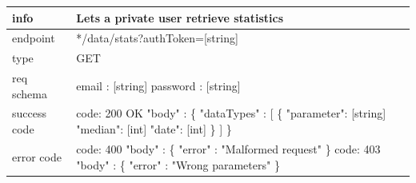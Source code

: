 \documentclass[titlepage]{article}
\begin{document}
\vspace{\baselineskip}

\begin{tabularx}{\textwidth}{lX} \hline
    info & Lets a private user retrieve statistics \\ \hline
    endpoint & */data/stats?authToken=[string] \\ \hline
    type & GET \\ \hline
    req schema & 
        email : [string] \newline
        password : [string] \\ \hline
    success code &
        code: 200 OK \newline  
        "body" : \{ \newline
        "dataTypes" : [\newline
        \{
        "parameter": [string] \newline
        "median": [int] \newline
        "date": [int] \newline
        \}
        ] \newline
        \} \\ \hline
    error code &
        code: 400 \newline
        "body" : \{ "error" : "Malformed request" \} \newline \newline
        code: 403 \newline
        "body" : \{ "error" : "Wrong parameters" \} \\ \hline
\end{tabularx}
		
\vspace{\baselineskip}
\end{document}
